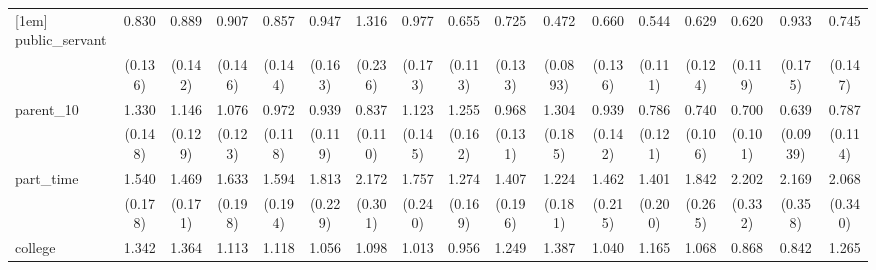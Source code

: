 {\begin{tabular}{l*{16}{c}}
[1em]
public\_servant      &       0.830         &       0.889         &       0.907         &       0.857         &       0.947         &       1.316         &       0.977         &       0.655\sym{*}  &       0.725         &       0.472\sym{***}&       0.660\sym{*}  &       0.544\sym{**} &       0.629\sym{*}  &       0.620\sym{*}  &       0.933         &       0.745         \\
                    &     (0.136)         &     (0.142)         &     (0.146)         &     (0.144)         &     (0.163)         &     (0.236)         &     (0.173)         &     (0.113)         &     (0.133)         &    (0.0893)         &     (0.136)         &     (0.111)         &     (0.124)         &     (0.119)         &     (0.175)         &     (0.147)         \\
[1em]
parent\_10           &       1.330\sym{*}  &       1.146         &       1.076         &       0.972         &       0.939         &       0.837         &       1.123         &       1.255         &       0.968         &       1.304         &       0.939         &       0.786         &       0.740\sym{*}  &       0.700\sym{*}  &       0.639\sym{**} &       0.787         \\
                    &     (0.148)         &     (0.129)         &     (0.123)         &     (0.118)         &     (0.119)         &     (0.110)         &     (0.145)         &     (0.162)         &     (0.131)         &     (0.185)         &     (0.142)         &     (0.121)         &     (0.106)         &     (0.101)         &    (0.0939)         &     (0.114)         \\
[1em]
part\_time           &       1.540\sym{***}&       1.469\sym{***}&       1.633\sym{***}&       1.594\sym{***}&       1.813\sym{***}&       2.172\sym{***}&       1.757\sym{***}&       1.274         &       1.407\sym{*}  &       1.224         &       1.462\sym{**} &       1.401\sym{*}  &       1.842\sym{***}&       2.202\sym{***}&       2.169\sym{***}&       2.068\sym{***}\\
                    &     (0.178)         &     (0.171)         &     (0.198)         &     (0.194)         &     (0.229)         &     (0.301)         &     (0.240)         &     (0.169)         &     (0.196)         &     (0.181)         &     (0.215)         &     (0.200)         &     (0.265)         &     (0.332)         &     (0.358)         &     (0.340)         \\
[1em]
college             &       1.342\sym{*}  &       1.364\sym{*}  &       1.113         &       1.118         &       1.056         &       1.098         &       1.013         &       0.956         &       1.249         &       1.387\sym{*}  &       1.040         &       1.165         &       1.068         &       0.868         &       0.842         &       1.265         \\

\end{tabular}}
